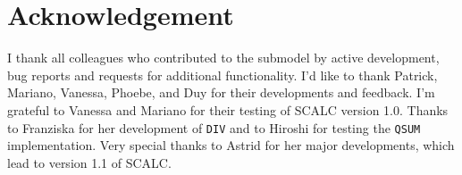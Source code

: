\documentclass[twoside]{article}
\begin{document}
\section{Acknowledgement}
I thank all colleagues who contributed to the submodel by active development, bug reports and requests for additional functionality.
I'd like to thank Patrick, Mariano, Vanessa, Phoebe, and Duy for their developments and feedback.
I'm grateful to Vanessa and Mariano for their testing of SCALC version 1.0.
Thanks to Franziska for her development of {\tt DIV} and to Hiroshi for testing the {\tt QSUM} implementation.
Very special thanks to Astrid for her major developments, which lead to version 1.1 of SCALC.
%
\end{document}
